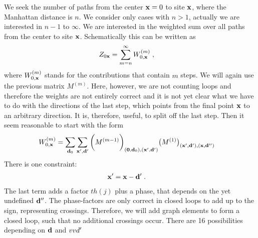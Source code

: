 We seek the number of paths from the center $\mathbf x=0$ to site $\mathbf x$, where the Manhattan distance is 
$n$. We consider only cases with $n>1$, actually we are interested in $n-1$ to $\infty$. 
We are interested in the weighted sum over all paths from the center to site $\mathbf x$. Schematically this can be written as
%
\begin{align*}
Z_{0 \mathbf x} &= \sum_{m=n}^{\infty}  W^{(m)}_{0,\mathbf x}\;,
\end{align*}
%
where $W^{(m)}_{0,\mathbf x}$ stands for the contributions that contain $m$ steps. We will again use the previous matrix $M^{(m)}$. Here, however, we are not counting loops and therefore the weights are not entirely correct
and it is not yet clear what we have to do with the directions of the last step, which points from the final point $\mathbf x$ to an arbitrary direction. It is, therefore, useful, to split off the last step. Then it seem reasonable to 
start with the form
%
\begin{align*}
W^{(m)}_{0,\mathbf x} &= \sum_{\mathbf d_{0}} \sum_{\mathbf x',\mathbf d'}  \bigg(M^{(m-1)}\bigg)_{(\mathbf 0,\mathbf d_{0}),(\mathbf x',\mathbf d')}  \big(M^{(1)}\big)_{(\mathbf x',\mathbf d'),(\mathbf x,\mathbf d'')}
\end{align*}
%
There is one constraint:
%
\begin{align*}
\mathbf x'  &= \mathbf x - \mathbf d'\;.
\end{align*}
%
The last term adds a factor $th(j)$ plus a phase, that depends on the yet undefined $\mathbf d''$.
The phase-factors are only correct in closed loops to add up to the sign, representing crossings.
Therefore, we will add graph elements to form a closed loop, such that no additional crossings occur.
There are 16 possibilities depending on $\mathbf d$ and $\\vv d'$
%
%
%
%


